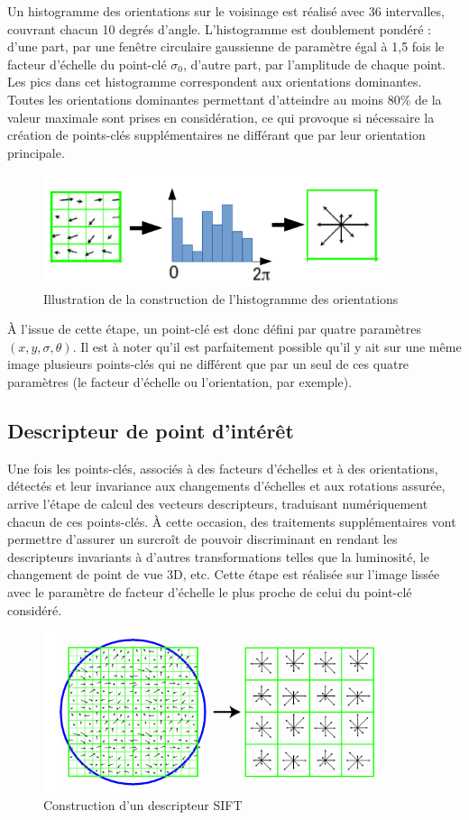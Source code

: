 Un histogramme des orientations sur le voisinage est réalisé avec 36 intervalles, couvrant chacun 10 degrés d'angle. L'histogramme est doublement pondéré : d'une part, par une fenêtre circulaire gaussienne de paramètre égal à 1,5 fois le facteur d'échelle du point-clé $\sigma_0$, d'autre part, par l'amplitude de chaque point. Les pics dans cet histogramme correspondent aux orientations dominantes. Toutes les orientations dominantes permettant d'atteindre au moins 80\% de la valeur maximale sont prises en considération, ce qui provoque si nécessaire la création de points-clés supplémentaires ne différant que par leur orientation principale\cite{low04}.

\begin{figure}[ht!]
\centering
\includegraphics[width=100mm]{images/sift_hist}
\caption{Illustration de la construction de l'histogramme des orientations}
\label{overflow}
\end{figure}

À l'issue de cette étape, un point-clé est donc défini par quatre paramètres $( x, y, \sigma, \theta )$. Il est à noter qu'il est parfaitement possible qu'il y ait sur une même image plusieurs points-clés qui ne différent que par un seul de ces quatre paramètres (le facteur d'échelle ou l'orientation, par exemple).


\subsection{Descripteur de point d'intérêt}
Une fois les points-clés, associés à des facteurs d'échelles et à des orientations, détectés et leur invariance aux changements d'échelles et aux rotations assurée, arrive l'étape de calcul des vecteurs descripteurs, traduisant numériquement chacun de ces points-clés. À cette occasion, des traitements supplémentaires vont permettre d'assurer un surcroît de pouvoir discriminant en rendant les descripteurs invariants à d'autres transformations telles que la luminosité, le changement de point de vue 3D, etc. Cette étape est réalisée sur l'image lissée avec le paramètre de facteur d'échelle le plus proche de celui du point-clé considéré\cite{low04}.
\begin{figure}[ht!]
\centering
\includegraphics[width=100mm]{images/siftdescriptor}
\caption{Construction d'un descripteur SIFT}
\label{overflow}
\end{figure}

